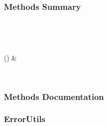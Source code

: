\documentclass[letterpaper,10pt,english]{sphinxmanual}
\begin{document}
\begin{fulllineitems}
\subsubsection*{Methods Summary}


\begin{savenotes}\sphinxatlongtablestart\begin{longtable}[c]{}
\hline

\endfirsthead

%
{}\\
\hline

\endhead

\hline
{}\\
\endfoot

\endlastfoot

{\hyperref[\detokenize{api/mastml.error_analysis.CorrectionFactors:mastml.error_analysis.CorrectionFactors.nll}]{}}()
&

\\
\hline
\end{longtable}\sphinxatlongtableend\end{savenotes}
\subsubsection*{Methods Documentation}

\begin{fulllineitems}
\label{\detokenize{api/mastml.error_analysis.CorrectionFactors:mastml.error_analysis.CorrectionFactors.nll}}
\end{fulllineitems}


\end{fulllineitems}



\subsubsection{ErrorUtils}
\label{\detokenize{api/mastml.error_analysis.ErrorUtils:errorutils}}\label{\detokenize{api/mastml.error_analysis.ErrorUtils::doc}}
\end{document}
